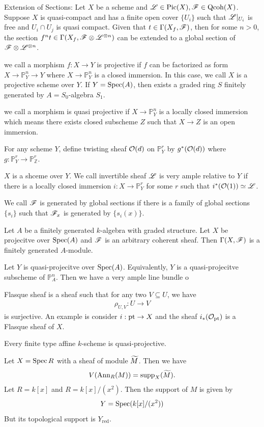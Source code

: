 {\np Extension of Sections: Let $X$ be a scheme and $\mathscr{L}\in \operatorname{Pic}(X),\mathscr{F}\in\operatorname{Qcoh}(X)$. 
Suppose $X$ is quasi-compact and has a finite open cover $\{U_i\}$ such that $\mathscr{L}|_{U_i}$ is free and $U_i\cap U_j$ is quasi compact.
Given that $t\in\Gamma(X_f,\mathscr{F})$, then for some $n>0$, the section $f^nt\in\Gamma(X_f,\mathscr{F}\otimes \mathscr{L}^{\otimes n})$ can be extended to a global section of $\mathscr{F}\otimes \mathscr{L}^{\otimes n}$.

\np we call a morphism $f:X\to Y$ is projective if $f$ can be factorized as form $X\to \mathbb{P}_{Y}^n\to Y$
where $X\to\mathbb{P}_Y^n$ is a closed immersion. 
In this case, we call $X$ is a projective scheme over $Y$.  If $Y=\operatorname{Spec}(A)$, then exists a graded ring $S$ finitely generated by $A=S_0$-algebra $S_1$.

\np we call a morphism is quasi projective if $X\to\mathbb{P}_Y^n$ is a locally closed immersion which means there exists closed subscheme $Z$ such that $X\to Z$ is an open immersion.  

\np For any scheme $Y$, define twisting sheaf $\mathcal{O}(d)$ on $\mathbb{P}_Y^r$ by $g^*(\mathcal{O}(d))$ where $g:\mathbb{P}_Y^r \to \mathbb{P}_{\mathbb{Z}}^r$.

\np $X$ is a shceme over $Y$. We call invertible sheaf $\mathscr{L}$ is very ample relative to $Y$ if there is a locally closed immersion $i:X \to \mathbb{P}_Y^r$ for some $r$ such that $i^*(\mathcal{O}(1))\simeq \mathscr{L}$. 


\np We call $\mathscr{F}$ is generated by global sections if there is a family of global sections $\{s_i\}$ such that $\mathscr{F}_x$ is generated by $\{s_i(x)\}$.

\np Let $A$ be a finitely generated $k$-algebra with graded structure. Let $X$ be projecitve over $\operatorname{Spec}(A)$ and $\mathscr{F}$ is an arbitrary coherent sheaf. Then $\Gamma(X,\mathscr{F})$ is a finitely generated $A$-module.

\np Let $Y$ is quasi-projecitve over $\operatorname{Spec}(A)$. Equivalently, $Y$ is a quasi-projecitve subscheme of $\mathbb{P}_{A}^n$. Then we have a very ample line bundle o



\np Flasque sheaf is a sheaf such that for any two $V\subseteq U$, we have 
\begin{align*}
    \rho_{U,V}:U\to V
\end{align*}
is surjective. An example is consider $i:\text{pt} \to X$ and the sheaf $i_*(\mathcal{O}_{\text{pt}})$ is a Flasque sheaf of $X$.

\np Every finite type affine $k$-scheme is quasi-projective.

\np Let $X=\operatorname{Spec} R$ with a sheaf of module $\widetilde{M}$. Then we have 
\begin{align*}
    V(\operatorname{Ann}_R(M)) = \operatorname{supp}_X(\widetilde{M}).
\end{align*}
Let $R=k[x]$ and $R=k[x]/(x^2)$. Then the support of $M$ is given by 
\begin{align*}
    Y = \operatorname{Spec}(k[x]/(x^2))
\end{align*}
But its topological support is $Y_{\text{red}}$.

}
